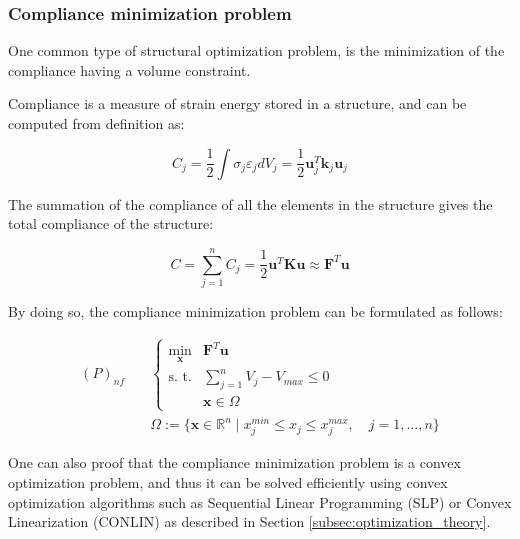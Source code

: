 \subsubsection{Compliance minimization problem}
\label{subsubsec:compliance_minimization_problem}

One common type of structural optimization problem, is the minimization of the compliance having a volume constraint.

Compliance is a measure of strain energy stored in a structure, and can be computed from definition as:

\begin{equation}
    C_j = \frac{1}{2} \int \sigma_j \varepsilon_j dV_j = \frac{1}{2} \bm{u}_j^T \bm{k}_j \bm{u}_j
    \label{eq:compliance_definition}
\end{equation}

The summation of the compliance of all the elements in the structure gives the total compliance of the structure:

\begin{equation}
    C = \sum_{j=1}^{n} C_j = \frac{1}{2} \bm{u}^T \bm{K} \bm{u} \approx \bm{F}^T \bm{u}
    \label{eq:total_compliance}
\end{equation}

By doing so, the compliance minimization problem can be formulated as follows:

\begin{equation}
    \begin{aligned}
        (P)_{nf} \quad & \begin{cases}
                             \min_{\bm{x}} & \bm{F}^T \bm{u}                     \\
                             \text{s. t.}  & \sum_{j=1}^{n} V_j - V_{max} \leq 0 \\
                                           & \bm{x} \in \Omega
                         \end{cases}                                 \\
                       & \Omega := \{ \bm{x} \in \mathbb{R}^n \mid x_j^{min} \le x_j \le x_j^{max}, \quad j = 1, \dots, n \}
    \end{aligned}
    \label{eq:compliance_minimization_problem}
\end{equation}

One can also proof that the compliance minimization problem is a convex optimization problem, and thus it can be solved efficiently using convex optimization algorithms such as Sequential Linear Programming (SLP) or Convex Linearization (CONLIN) as described in Section \ref{subsec:optimization_theory}.

